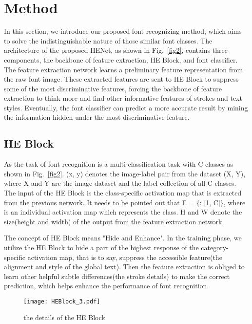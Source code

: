 \documentclass[manuscript,screen]{acmart}
\begin{document}
\section{Method}
In this section, we introduce our proposed font recognizing method, which aims to solve the indistinguishable nature of those similar font classes. The architecture of the proposed HENet, as shown in Fig.~\ref{fig2}, contains three components, the backbone of feature extraction, HE Block, and font classifier. The feature extraction network learns a preliminary feature representation from the raw font image. These extracted features are sent to HE Block to suppress some of the most discriminative features, forcing the backbone of feature extraction to think more and find other informative features of strokes and text styles. Eventually, the font classifier can predict a more accurate result by mining the information hidden under the most discriminative feature. 




\subsection{HE Block}
As the task of font recognition is a multi-classification task with C classes as shown in Fig.~\ref{fig2}. (x, y) denotes the image-label pair from the dataset (X, Y), where X and Y are the image dataset and the label collection of all C classes. The input of the HE Block  is the class-specific activation map that is extracted from the previous network. It needs to be pointed out that F = \{: [1, C]\}, where  is an individual activation map which represents the   class. H and W denote the size(height and width) of the output from the feature extraction network. 

The concept of HE Block means "Hide and Enhance". In the training phase, we utilize the HE Block to hide a part of the highest response of the category-specific activation map, that is to say, suppress the accessible feature(the alignment and style of the global text). Then the feature extraction is obliged to learn other helpful subtle differences(the stroke details) to make the correct prediction, which helps enhance the performance of font recognition.

\begin{figure}[ht]
\centering
\texttt{[image: HEBlock\_3.pdf]}
\caption{the details of the HE Block}
\label{fig3}
\end{figure}
\end{document}
